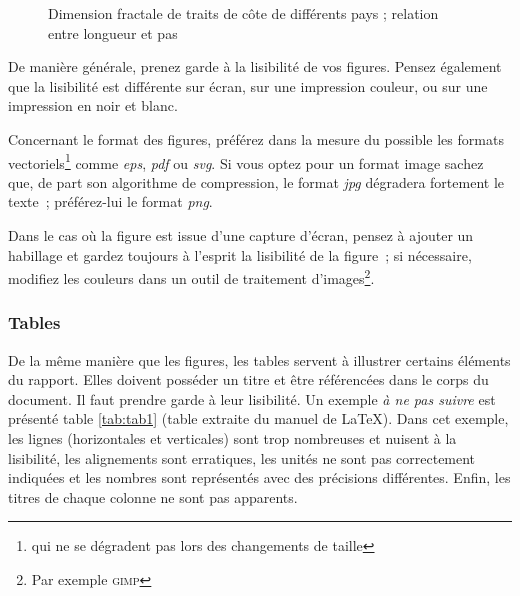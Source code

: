 \begin{figure}[htbp]
  \centering
{}
  \caption{Dimension fractale de traits de côte de différents pays ; relation entre longueur et pas}
  \label{fig:fract}
\end{figure}

De manière générale, prenez garde à la lisibilité de vos figures. Pensez
également que la lisibilité est différente sur écran, sur une impression
couleur, ou sur une impression en noir et blanc.

Concernant le format des figures, préférez dans la mesure du possible les
formats vectoriels\footnote{qui ne se dégradent pas lors des changements de
  taille} comme \emph{eps}, \emph{pdf} ou \emph{svg}. Si vous optez pour un
format image sachez que, de part son algorithme de compression, le format
\emph{jpg} dégradera fortement le texte~; préférez-lui le format \emph{png}.

Dans le cas où la figure est issue d'une capture d'écran, pensez à ajouter un
habillage et gardez toujours à l'esprit la lisibilité de la figure~; si
nécessaire, modifiez les couleurs dans un outil de traitement
d'images\footnote{Par exemple \textsc{gimp}}. 

\subsubsection{Tables}

De la même manière que les figures, les tables servent à illustrer certains
éléments du rapport. Elles doivent posséder un titre et être
référencées dans le corps du document. Il faut prendre garde à leur
lisibilité. Un exemple \emph{à ne pas suivre} est présenté table
\ref{tab:tab1} (table extraite du manuel de \LaTeX). Dans cet exemple, les
lignes (horizontales et verticales) sont 
trop nombreuses et nuisent à la lisibilité, les alignements sont erratiques,
les unités ne sont pas correctement indiquées et les nombres sont représentés
avec des précisions différentes. Enfin, les titres de chaque colonne ne sont
pas apparents.

